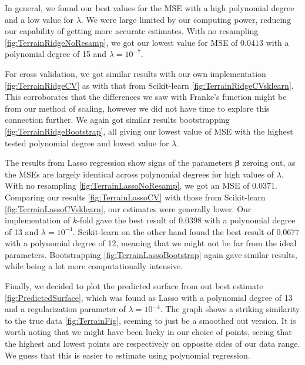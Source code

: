 \documentclass{article}
\begin{document}
In general, we found our best values for the MSE with a high polynomial degree and a low value for $\lambda$. We were large limited by our computing power, reducing our capability of getting more accurate estimates. With no resampling \ref{fig:TerrainRidgeNoResamp}, we got our lowest value for MSE of $0.0413$ with a polynomial degree of 15 and $\lambda=10^{-7}$.

For cross validation, we got similar results with our own implementation \ref{fig:TerrainRidgeCV} as with that from Scikit-learn \ref{fig:TerrainRidgeCVsklearn}. This corroborates that the differences we saw with Franke's function might be from our method of scaling, however we did not have time to explore this connection further. We again got similar results bootstrapping \ref{fig:TerrainRidgeBootstrap}, all giving our lowest value of MSE with the highest tested polynomial degree and lowest value for $\lambda$.

The results from Lasso regression show signs of the parameters $\boldsymbol{\beta}$ zeroing out, as the MSEs are largely identical across polynomial degrees for high values of $\lambda$. With no resampling \ref{fig:TerrainLassoNoResamp}, we got an MSE of $0.0371$. Comparing our results \ref{fig:TerrainLassoCV} with those from Scikit-learn \ref{fig:TerrainLassoCVsklearn}, our estimates were generally lower. Our implementation of $k$-fold gave the best result of $0.0398$ with a polynomial degree of 13 and $\lambda=10^{-4}$. Scikit-learn on the other hand found the best result of $0.0677$ with a polynomial degree of 12, meaning that we might not be far from the ideal parameters. Bootstrapping \ref{fig:TerrainLassoBootstrap} again gave similar results, while being a lot more computationally intensive.

Finally, we decided to plot the predicted surface from out best estimate \ref{fig:PredictedSurface}, which was found as Lasso with a polynomial degree of 13 and a regularization parameter of $\lambda = 10^{-4}$. The graph shows a striking similarity to the true data \ref{fig:TerrainFig}, seeming to just be a smoothed out version. It is worth noting that we might have been lucky in our choice of points, seeing that the highest and lowest points are respectively on opposite sides of our data range. We guess that this is easier to estimate using polynomial regression.
\end{document}
